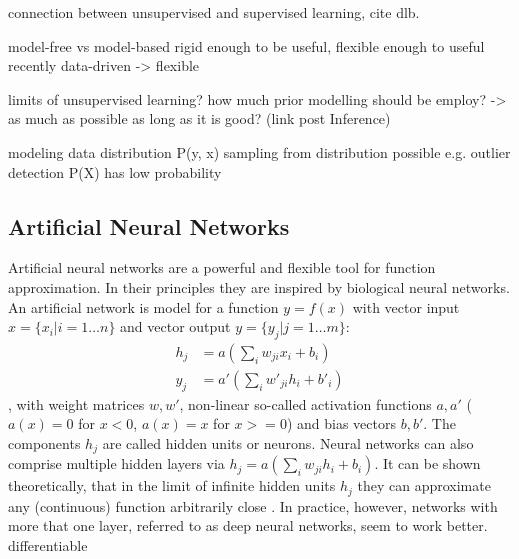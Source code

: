 		connection between unsupervised and supervised learning, cite dlb.

		model-free vs model-based
		rigid enough to be useful, flexible enough to useful
		recently data-driven -> flexible

		limits of unsupervised learning?
		how much prior modelling should be employ?
		-> as much as possible as long as it is good? (link post Inference)

		modeling data distribution P(y, x)
		sampling from distribution possible
		e.g. outlier detection P(X) has low probability


	\subsection{Artificial Neural Networks}\label{sec:neuralnetworks}
		Artificial neural networks are a powerful and flexible tool for function approximation. In their principles they are inspired by biological neural networks. An artificial network is model for a function $y = f(x)$ with vector input $x = \{ x_i | i = 1 \ldots n \}$ and vector output $y = \{ y_j | j = 1 \ldots m \}$:
		\begin{equation} \label{eq1}
			\begin{split}
				h_j & =  a (\sum_i w_{ji} x_i + b_i)  \\
				y_j & =  a' (\sum_i w'_{ji} h_i + b'_i)
			\end{split}
		\end{equation},
		with weight matrices $w, w'$, non-linear so-called activation functions $a, a'$ (\eg $a(x)=0$ for $x<0$, $a(x)=x$ for $x>=0$) and bias vectors $b, b'$.
		The components $h_j$ are called hidden units or neurons. Neural networks can also comprise multiple hidden layers via $h_j  =  a (\sum_i w_{ji} h_i + b_i)$.
		It can be shown theoretically, that in the limit of infinite hidden units $h_j$ they can approximate any (continuous) function arbitrarily close \cite{cybenko89approx} .
		In practice, however, networks with more that one layer, referred to as deep neural networks, seem to work better.
		differentiable

